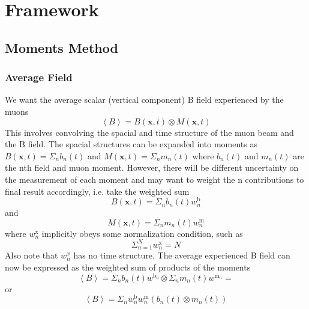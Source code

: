 \documentclass[twoside]{article}
\begin{document}
\section{Framework}
\begin{multicols}{2} %
\subsection{Moments Method}
\subsubsection{Average Field}

We want the average scalar (vertical component) B field experienced by the muons
\begin{equation}
\left\langle B \right\rangle = B(\textbf{x},t) \otimes M(\textbf{x},t)
\end{equation}
This involves convolving the spacial and time structure of the muon beam and the B field. The spacial structures can be expanded into moments as $B(\textbf{x},t) = \Sigma_n b_n(t)$ and $M(\textbf{x},t) = \Sigma_n m_n(t)$ where $b_n(t)$  and $m_n(t)$ are the nth field and muon moment. However,  there will be different uncertainty on the measurement of each moment and may want to weight the n contributions to final result accordingly, i.e. take the weighted sum
\begin{equation}
B(\textbf{x},t) = \Sigma_n b_n(t) w^{\text{b}}_n 
\end{equation}
and 
\begin{equation}
M(\textbf{x},t) = \Sigma_n m_n(t) w^{\text{m}}_n
\end{equation}
where $w^{\text{x}}_n$ implicitly obeys some normalization condition, such as 
\begin{equation}
\Sigma^N_{n=1}  w^{\text{x}}_n = N
\end{equation}
Also note that $w^x_n$ has no time structure. 
The average experienced B field can now be expressed as the weighted sum of products of the moments
\begin{equation}
\left\langle B \right\rangle = 
\Sigma_n b_n(t) w^{\text{b}_n}  \otimes  
\Sigma_n m_n(t) w^{\text{m}_n} = 
\end{equation}
or
\begin{equation}
\left\langle B \right\rangle = 
\Sigma_n w^{\text{b}}_n w^{\text{m}}_n (b_{n}(t) \otimes m_{n}(t))
\end{equation}

\end{multicols}
\end{document}

